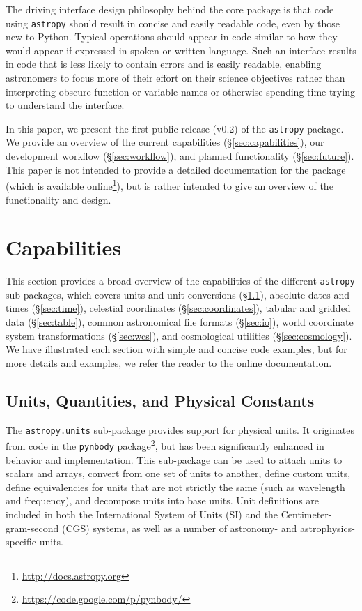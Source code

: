 \documentclass[traditabstract]{aa}
\newcommand{\astropy}{\texttt{astropy}\xspace}
\begin{document}
The driving interface design philosophy behind the core package is that code
using \astropy should result in concise and easily readable code, even by those new to
Python. Typical operations should appear in code similar to how they would
appear if expressed in spoken or written language. Such an interface results in
code that is less likely to contain errors and is easily readable, enabling
astronomers to focus more of their effort on their science objectives rather
than interpreting obscure function or variable names or otherwise spending time
trying to understand the interface.

In this paper, we present the first public release (v0.2) of the \astropy
package. We provide an overview of the current capabilities
(\S\ref{sec:capabilities}), our development workflow (\S\ref{sec:workflow}),
and planned functionality (\S\ref{sec:future}). This paper is not intended to
provide a detailed documentation for the package (which is available
online\footnote{\url{http://docs.astropy.org}}), but is rather intended to give
an overview of the functionality and design.

\section{Capabilities}

This section provides a broad overview of the capabilities of the different
\astropy sub-packages, which covers units and unit conversions
(\S\ref{sec:units_main}), absolute dates and times (\S\ref{sec:time}),
celestial coordinates (\S\ref{sec:coordinates}), tabular and gridded data
(\S\ref{sec:table}), common astronomical file formats (\S\ref{sec:io}), world
coordinate system transformations (\S\ref{sec:wcs}), and cosmological utilities
(\S\ref{sec:cosmology}). We have illustrated each section with simple and
concise code examples, but for more details and examples, we refer the reader
to the online documentation\footnotemark[4].

\label{sec:capabilities}

\subsection{Units, Quantities, and Physical Constants}

\label{sec:units_main}


The \texttt{astropy.units} sub-package provides support for physical units. It
originates from code in the \texttt{pynbody}
package\footnote{\url{https://code.google.com/p/pynbody/}}, but has been
significantly enhanced in behavior and implementation. This sub-package can be
used to attach units to scalars and arrays, convert from one set of units to
another, define custom units, define equivalencies for units that are not
strictly the same (such as wavelength and frequency), and decompose units into
base units. Unit definitions are included in both the International System of
Units (SI) and the Centimeter-gram-second (CGS) systems, as well as a number of
astronomy- and astrophysics-specific units.
\end{document}
